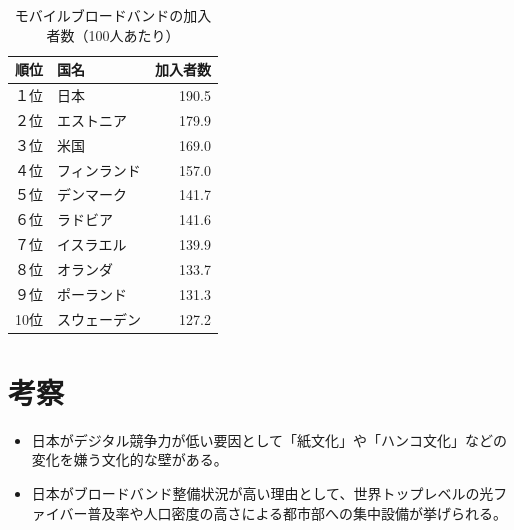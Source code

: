 \documentclass[a4paper,11pt,dvipdfmx]{ujarticle}
\begin{document}
 \begin{table}[htbp]
    \caption{モバイルブロードバンドの加入者数（100人あたり）}
    \centering
    \label{tbl:モバイルブロードバンドの加入者数（100人あたり）}

    \begin{tabular}{|c|l|r|}\hline
        順位 & 国名 & 加入者数 \\
        \hline
        １位 & 日本 & 190.5  \\
        \hline
        ２位 & エストニア & 179.9 \\
        \hline
        ３位 & 米国 & 169.0 \\
        \hline
        ４位 & フィンランド & 157.0 \\
        \hline
        ５位 & デンマーク & 141.7 \\
        \hline
        ６位 & ラドビア & 141.6 \\
        \hline
        ７位 & イスラエル & 139.9 \\
        \hline 
        ８位 & オランダ & 133.7 \\
        \hline
        ９位 & ポーランド & 131.3 \\
        \hline
        10位 & スウェーデン & 127.2 \\
        \hline
    \end{tabular}   
\end{table} 
\section{考察}
 \begin{itemize}
    \item 日本がデジタル競争力が低い要因として「紙文化」や「ハンコ文化」などの変化を嫌う文化的な壁がある。
    \item 日本がブロードバンド整備状況が高い理由として、世界トップレベルの光ファイバー普及率や人口密度の高さによる都市部への集中設備が挙げられる。
 \end{itemize}
 

%


\end{document}

